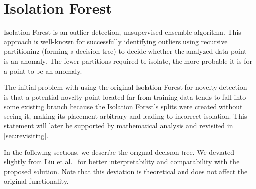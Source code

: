 \section{Isolation Forest}
\label{sec:isolation_forest}

Isolation Forest
\cite{liu2008isolation, liu2012isolation} is an outlier
detection, unsupervised ensemble algorithm. This approach is well-known for successfully identifying outliers using recursive partitioning (forming a decision tree) to decide whether the analyzed data point is an anomaly. The fewer partitions required to isolate, the more probable it is for a point to be an anomaly.

The initial problem with using the original Isolation Forest for novelty detection is that a potential novelty point located far from training data tends to fall into some existing branch because the Isolation Forest's splits were created without seeing it, making its placement arbitrary and leading to incorrect isolation.
This statement will later be supported by mathematical analysis and revisited in \ref{sec:revisiting}.

In the following sections, we describe the original decision tree.
We deviated slightly from Liu et al.~\cite{liu2008isolation} for better interpretability and comparability with the proposed solution.
Note that this deviation is theoretical and does not affect the original functionality.





